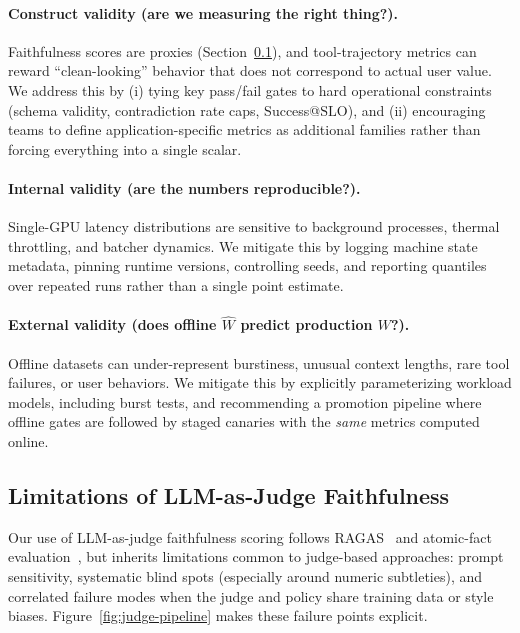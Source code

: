 \documentclass[11pt]{article}
\newcommand{\slo}{\ensuremath{\mathrm{SLO}}}
\begin{document}
\paragraph{Construct validity (are we measuring the right thing?).}
Faithfulness scores are proxies (Section~\ref{sec:discussion-judge}), and tool-trajectory metrics can reward ``clean-looking'' behavior that does not correspond to actual user value.
We address this by (i) tying key pass/fail gates to hard operational constraints (schema validity, contradiction rate caps, Success@\slo), and (ii) encouraging teams to define application-specific metrics as additional families rather than forcing everything into a single scalar.

\paragraph{Internal validity (are the numbers reproducible?).}
Single-GPU latency distributions are sensitive to background processes, thermal throttling, and batcher dynamics.
We mitigate this by logging machine state metadata, pinning runtime versions, controlling seeds, and reporting quantiles over repeated runs rather than a single point estimate.

\paragraph{External validity (does offline $\widehat{W}$ predict production $W$?).}
Offline datasets can under-represent burstiness, unusual context lengths, rare tool failures, or user behaviors.
We mitigate this by explicitly parameterizing workload models, including burst tests, and recommending a promotion pipeline where offline gates are followed by staged canaries with the \emph{same} metrics computed online.

\subsection{Limitations of LLM-as-Judge Faithfulness}
\label{sec:discussion-judge}

Our use of LLM-as-judge faithfulness scoring follows RAGAS~\citep{es2023ragas} and atomic-fact evaluation~\citep{atomicFacts2024}, but inherits limitations common to judge-based approaches: prompt sensitivity, systematic blind spots (especially around numeric subtleties), and correlated failure modes when the judge and policy share training data or style biases.
Figure~\ref{fig:judge-pipeline} makes these failure points explicit.
\end{document}
